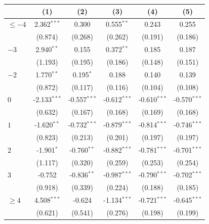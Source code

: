 
\begingroup
\centering
\begin{tabular}{lccccc}
   \toprule
                        & (1)            & (2)            & (3)            & (4)            & (5)\\  
   \midrule 
   $\leq -4$            & 2.362$^{***}$  & 0.300          & 0.555$^{**}$   & 0.243          & 0.255\\   
                        & (0.874)        & (0.268)        & (0.262)        & (0.191)        & (0.186)\\   
   $-3$                 & 2.940$^{**}$   & 0.155          & 0.372$^{**}$   & 0.185          & 0.187\\   
                        & (1.193)        & (0.195)        & (0.186)        & (0.148)        & (0.151)\\   
   $-2$                 & 1.770$^{**}$   & 0.195$^{*}$    & 0.188          & 0.140          & 0.139\\   
                        & (0.872)        & (0.117)        & (0.116)        & (0.104)        & (0.108)\\   
   $0$                  & -2.133$^{***}$ & -0.557$^{***}$ & -0.612$^{***}$ & -0.610$^{***}$ & -0.570$^{***}$\\   
                        & (0.632)        & (0.167)        & (0.168)        & (0.169)        & (0.168)\\   
   $1$                  & -1.620$^{**}$  & -0.732$^{***}$ & -0.879$^{***}$ & -0.814$^{***}$ & -0.746$^{***}$\\   
                        & (0.823)        & (0.213)        & (0.201)        & (0.197)        & (0.197)\\   
   $2$                  & -1.901$^{*}$   & -0.760$^{**}$  & -0.882$^{***}$ & -0.781$^{***}$ & -0.701$^{***}$\\   
                        & (1.117)        & (0.320)        & (0.259)        & (0.253)        & (0.254)\\   
   $3$                  & -0.752         & -0.836$^{**}$  & -0.987$^{***}$ & -0.790$^{***}$ & -0.702$^{***}$\\   
                        & (0.918)        & (0.339)        & (0.224)        & (0.188)        & (0.185)\\   
   $\geq 4$             & 4.508$^{***}$  & -0.624         & -1.134$^{***}$ & -0.721$^{***}$ & -0.645$^{***}$\\   
                        & (0.621)        & (0.541)        & (0.276)        & (0.198)        & (0.199)\\   

\end{tabular}
